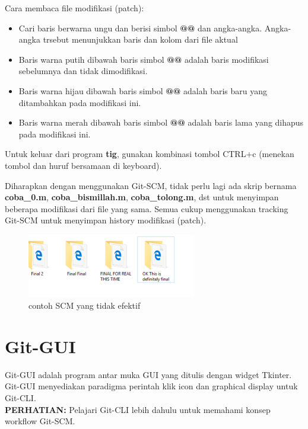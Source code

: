 \documentclass[12pt]{book}
\begin{document}
	Cara membaca file modifikasi (patch):
	\begin{itemize}
		\item Cari baris berwarna ungu dan berisi simbol \textbf{@@} dan angka-angka.
		Angka-angka trsebut menunjukkan baris dan kolom dari file aktual

		\item Baris warna putih dibawah baris simbol \textbf{@@} adalah baris modifikasi sebelumnya dan tidak dimodifikasi.

		\item Baris warna hijau dibawah baris simbol \textbf{@@} adalah baris baru yang ditambahkan pada modifikasi ini.

		\item Baris warna merah dibawah baris simbol \textbf{@@} adalah baris lama yang dihapus pada modifikasi ini.
	\end{itemize}

	Untuk keluar dari program \textbf{tig}, gunakan kombinasi tombol CTRL+c (menekan tombol  dan huruf  bersamaan di keyboard).

	Diharapkan dengan menggunakan Git-SCM, tidak perlu lagi ada skrip bernama \textbf{coba\_0.m}, \textbf{coba\_bismillah.m}, \textbf{coba\_tolong.m}, dst
	untuk menyimpan beberapa modifikasi dari file yang sama.
	Semua cukup menggunakan tracking Git-SCM untuk menyimpan history modifikasi (patch).

	\begin{figure}[!ht]
		\centering
		\includegraphics[width=210pt]{images/memescm}
		\caption{contoh SCM yang tidak efektif}
	\end{figure}

	\newpage
	\section{Git-GUI}

	Git-GUI adalah program antar muka GUI yang ditulis dengan widget Tkinter.
	Git-GUI menyediakan paradigma perintah klik icon dan graphical display untuk Git-CLI.\\

	\textbf{PERHATIAN:} Pelajari Git-CLI lebih dahulu untuk memahami konsep workflow Git-SCM.\\
\end{document}
